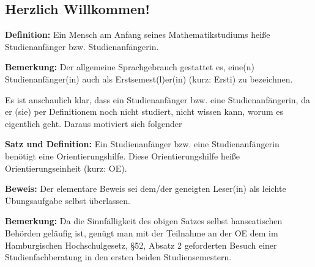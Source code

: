 \subsection*{Herzlich Willkommen!}

\textbf{Definition:} Ein Mensch am Anfang seines Mathematikstudiums heiße
Studienanfänger bzw.  Studienanfängerin.

\textbf{Bemerkung:} Der allgemeine Sprachgebrauch gestattet es, eine(n)
Studienanfänger(in) auch als Erstsemest(l)er(in) (kurz: Ersti) zu bezeichnen.

Es ist anschaulich klar, dass ein Studienanfänger bzw. eine Studienanfängerin,
da er (sie) per Definitionem noch nicht studiert, nicht wissen kann, worum es
eigentlich geht. Daraus motiviert sich folgender

\textbf{Satz und Definition:} Ein Studienanfänger bzw. eine Studienanfängerin
benötigt eine Orientierungshilfe. Diese Orientierungshilfe heiße
Orientierungseinheit (kurz: OE).

\textbf{Beweis:} Der elementare Beweis sei dem/der geneigten Leser(in) als
leichte Übungsaufgabe selbst überlassen.

\textbf{Bemerkung:} Da die Sinnfälligkeit des obigen Satzes selbst
hanseatischen Behörden geläufig ist, genügt man mit der Teilnahme an der OE dem
im Hamburgischen Hochschulgesetz, \S 52, Absatz 2 geforderten Besuch einer
Studienfachberatung in den ersten beiden Studiensemestern.
